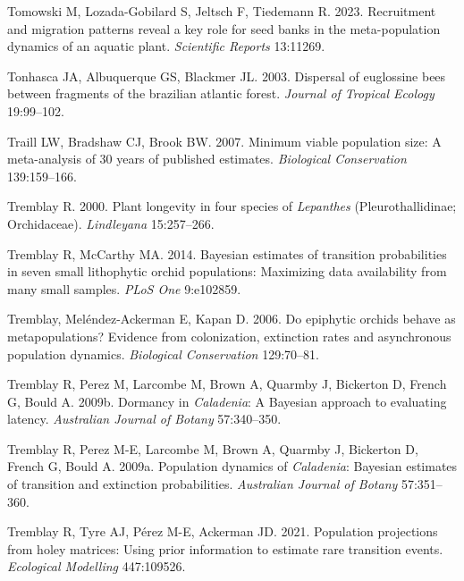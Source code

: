 \documentclass[
  12pt,
  letterpaper,
]{book}
\newlength{\cslhangindent}
\newenvironment{CSLReferences}[2] %
 {\begin{list}{}{%
  \setlength{\itemindent}{0pt}
  \setlength{\leftmargin}{0pt}
  \setlength{\parsep}{0pt}
  \ifodd #1
   \setlength{\leftmargin}{\cslhangindent}
   \setlength{\itemindent}{-1\cslhangindent}
  \fi
  \setlength{\itemsep}{#2\baselineskip}}}
 {\end{list}}
\begin{document}
\begin{CSLReferences}{1}{0}
Tomowski M, Lozada-Gobilard S, Jeltsch F, Tiedemann R. 2023. Recruitment
and migration patterns reveal a key role for seed banks in the
meta-population dynamics of an aquatic plant. \emph{Scientific Reports}
13:11269.

Tonhasca JA, Albuquerque GS, Blackmer JL. 2003. Dispersal of euglossine
bees between fragments of the brazilian atlantic forest. \emph{Journal
of Tropical Ecology} 19:99--102.

Traill LW, Bradshaw CJ, Brook BW. 2007. Minimum viable population size:
A meta-analysis of 30 years of published estimates. \emph{Biological
Conservation} 139:159--166.

Tremblay R. 2000. Plant longevity in four species of \emph{{L}epanthes}
({P}leurothallidinae; {O}rchidaceae). \emph{Lindleyana} 15:257--266.

Tremblay R, McCarthy MA. 2014. Bayesian estimates of transition
probabilities in seven small lithophytic orchid populations: Maximizing
data availability from many small samples. \emph{PLoS One} 9:e102859.

Tremblay, Meléndez-Ackerman E, Kapan D. 2006. Do epiphytic orchids
behave as metapopulations? Evidence from colonization, extinction rates
and asynchronous population dynamics. \emph{Biological Conservation}
129:70--81.

Tremblay R, Perez M, Larcombe M, Brown A, Quarmby J, Bickerton D, French
G, Bould A. 2009b. Dormancy in \emph{{C}aladenia}: A {B}ayesian approach
to evaluating latency. \emph{Australian Journal of Botany} 57:340--350.

Tremblay R, Perez M-E, Larcombe M, Brown A, Quarmby J, Bickerton D,
French G, Bould A. 2009a. Population dynamics of \emph{{C}aladenia}:
Bayesian estimates of transition and extinction probabilities.
\emph{Australian Journal of Botany} 57:351--360.

Tremblay R, Tyre AJ, Pérez M-E, Ackerman JD. 2021. Population
projections from holey matrices: Using prior information to estimate
rare transition events. \emph{Ecological Modelling} 447:109526.


\end{CSLReferences}
\end{document}
